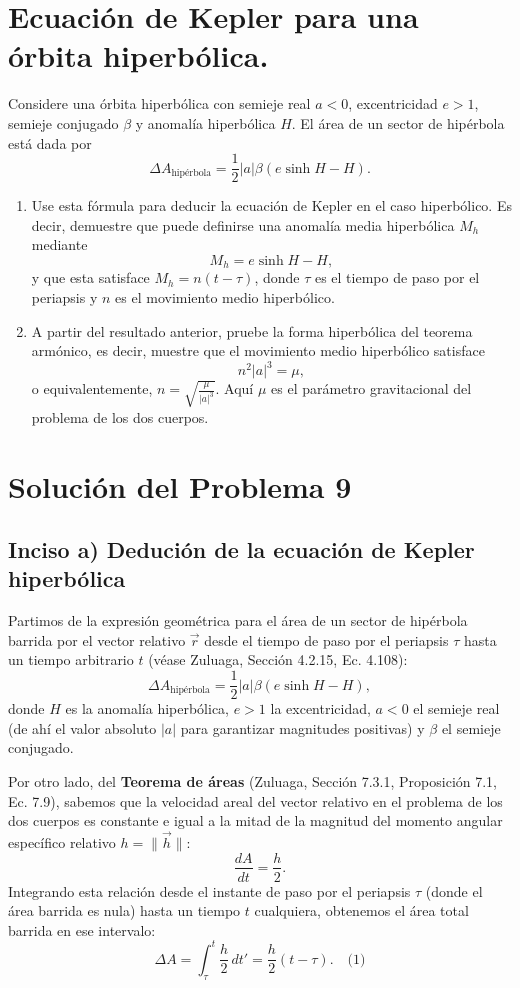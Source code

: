 \documentclass[12pt, a4paper]{article}
\begin{document}
\section{Ecuación de Kepler para una órbita hiperbólica.} Considere una órbita hiperbólica con semieje real $a < 0$, excentricidad $e > 1$, semieje conjugado $\beta$ y anomalía hiperbólica $H$. El área de un sector de hipérbola está dada por
$$\Delta A_{\text{hipérbola}} = \frac{1}{2} |a| \beta (e \sinh H - H).$$
\begin{enumerate}
    \item[a)] Use esta fórmula para deducir la ecuación de Kepler en el caso hiperbólico. Es decir, demuestre que puede definirse una anomalía media hiperbólica $M_h$ mediante
    $$M_h = e \sinh H - H,$$
    y que esta satisface $M_h = n(t - \tau)$, donde $\tau$ es el tiempo de paso por el periapsis y $n$ es el movimiento medio hiperbólico.
    \item[b)] A partir del resultado anterior, pruebe la forma hiperbólica del teorema armónico, es decir, muestre que el movimiento medio hiperbólico satisface
    $$n^2 |a|^3 = \mu,$$
    o equivalentemente, $n = \sqrt{\frac{\mu}{|a|^3}}$. Aquí $\mu$ es el parámetro gravitacional del problema de los dos cuerpos.
\end{enumerate}



\section*{Solución del Problema 9}

\subsection*{Inciso a) Dedución de la ecuación de Kepler hiperbólica}
Partimos de la expresión geométrica para el área de un sector de hipérbola barrida por el vector relativo $\vec{r}$ desde el tiempo de paso por el periapsis $\tau$ hasta un tiempo arbitrario $t$ (véase Zuluaga, Sección 4.2.15, Ec. 4.108):
$$
\Delta A_{\text{hipérbola}} = \frac{1}{2} |a| \beta \left( e \sinh H - H \right),
$$
donde $H$ es la anomalía hiperbólica, $e > 1$ la excentricidad, $a < 0$ el semieje real (de ahí el valor absoluto $|a|$ para garantizar magnitudes positivas) y $\beta$ el semieje conjugado.

Por otro lado, del \textbf{Teorema de áreas} (Zuluaga, Sección 7.3.1, Proposición 7.1, Ec. 7.9), sabemos que la velocidad areal del vector relativo en el problema de los dos cuerpos es constante e igual a la mitad de la magnitud del momento angular específico relativo $h = \|\vec{h}\|$:
$$
\frac{dA}{dt} = \frac{h}{2}.
$$
Integrando esta relación desde el instante de paso por el periapsis $\tau$ (donde el área barrida es nula) hasta un tiempo $t$ cualquiera, obtenemos el área total barrida en ese intervalo:
$$
\Delta A = \int_{\tau}^{t} \frac{h}{2} \, dt' = \frac{h}{2} (t - \tau). \quad \text{(1)}
$$
\end{document}
